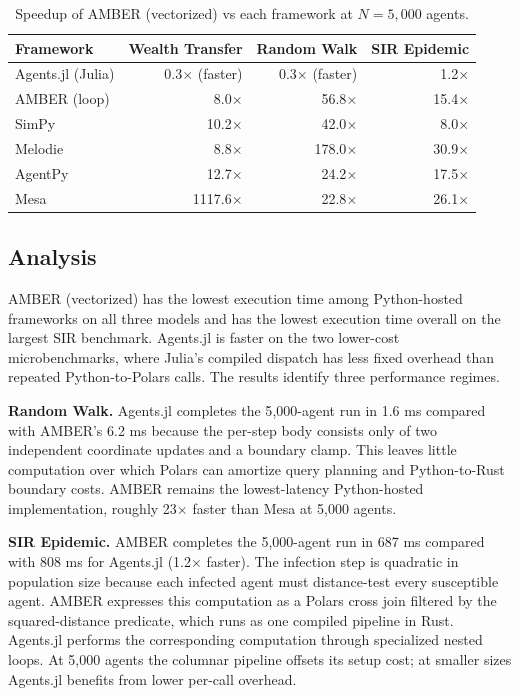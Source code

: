\documentclass[11pt,a4paper]{article}
\begin{document}
\begin{table}[H]
\centering
\caption{Speedup of AMBER (vectorized) vs each framework at $N = 5{,}000$ agents.}
\label{tab:speedups}
\begin{tabular}{lrrr}
\toprule
\textbf{Framework} & \textbf{Wealth Transfer} & \textbf{Random Walk} & \textbf{SIR Epidemic} \\
\midrule
Agents.jl (Julia)  & 0.3$\times$ (faster) & 0.3$\times$ (faster) & 1.2$\times$ \\
AMBER (loop)       & 8.0$\times$  & 56.8$\times$ & 15.4$\times$ \\
SimPy              & 10.2$\times$ & 42.0$\times$ & 8.0$\times$ \\
Melodie            & 8.8$\times$  & 178.0$\times$ & 30.9$\times$ \\
AgentPy            & 12.7$\times$ & 24.2$\times$ & 17.5$\times$ \\
Mesa               & 1117.6$\times$ & 22.8$\times$ & 26.1$\times$ \\
\bottomrule
\end{tabular}
\end{table}

\subsection{Analysis}

AMBER (vectorized) has the lowest execution time among Python-hosted frameworks on all three models and has the lowest execution time overall on the largest SIR benchmark. Agents.jl is faster on the two lower-cost microbenchmarks, where Julia's compiled dispatch has less fixed overhead than repeated Python-to-Polars calls. The results identify three performance regimes.

\textbf{Random Walk.} Agents.jl completes the 5{,}000-agent run in 1.6 ms compared with AMBER's 6.2 ms because the per-step body consists only of two independent coordinate updates and a boundary clamp. This leaves little computation over which Polars can amortize query planning and Python-to-Rust boundary costs. AMBER remains the lowest-latency Python-hosted implementation, roughly 23$\times$ faster than Mesa at 5{,}000 agents.

\textbf{SIR Epidemic.} AMBER completes the 5{,}000-agent run in 687 ms compared with 808 ms for Agents.jl (1.2$\times$ faster). The infection step is quadratic in population size because each infected agent must distance-test every susceptible agent. AMBER expresses this computation as a Polars cross join filtered by the squared-distance predicate, which runs as one compiled pipeline in Rust. Agents.jl performs the corresponding computation through specialized nested loops. At 5{,}000 agents the columnar pipeline offsets its setup cost; at smaller sizes Agents.jl benefits from lower per-call overhead.
\end{document}
